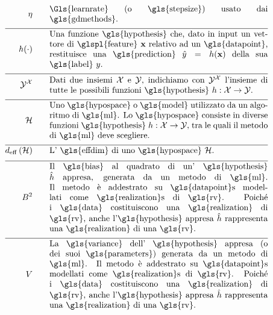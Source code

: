 \begin{align}
\lrate  \quad\quad & \parbox{.75\textwidth}{\Gls{learnrate} (o \gls{stepsize}) usato dai \gls{gdmethods}.}  \nonumber \\[2mm] \hline \nonumber\\[-5mm]
	\hypothesis(\cdot)  \quad\quad &\parbox{.75\textwidth}{Una funzione \gls{hypothesis} che, dato in input un vettore di \glspl{feature} $\featurevec$ relativo ad un \gls{datapoint}, restituisce una \gls{prediction} $\hat{\truelabel}=\hypothesis(\featurevec)$ della sua \gls{label} $\truelabel$.}  	 \nonumber \\[2mm] \hline \nonumber\\[-5mm]
	 \labelspace^{\featurespace} \quad\quad & \parbox{.75\textwidth}{Dati due insiemi $\featurespace$ e $\labelspace$, indichiamo con $ \labelspace^{\featurespace}$ l'insieme di tutte le possibili funzioni \gls{hypothesis} $\hypothesis: \featurespace \rightarrow \labelspace$.} 	 \nonumber \\[2mm] \hline \nonumber\\[-5mm]
	\hypospace  \quad\quad & \parbox{.75\textwidth}{Uno \gls{hypospace} o \gls{model} utilizzato da un algoritmo di \gls{ml}. 
		Lo \gls{hypospace} consiste in diverse funzioni \gls{hypothesis} $\hypothesis: \featurespace \rightarrow \labelspace$, tra le quali il metodo di \gls{ml} deve scegliere.}   \nonumber \\[2mm] \hline \nonumber\\[-5mm]
	\effdim{\hypospace}  \quad\quad & \parbox{.75\textwidth}{L' \gls{effdim} di uno \gls{hypospace} $\hypospace$.}   \nonumber \\[2mm] \hline \nonumber\\[-5mm]
	\biasterm^2 \quad\quad &\parbox{.75\textwidth}{
		Il \gls{bias} al quadrato di un' \gls{hypothesis} $\learnthypothesis$ 
		appresa, generata da un metodo di \gls{ml}. Il metodo è addestrato su \gls{datapoint}s 
		modellati come \gls{realization}s di \gls{rv}. Poiché i \gls{data} costituiscono una \gls{realization} 
		di \gls{rv}, anche l'\gls{hypothesis} appresa $\learnthypothesis$ rappresenta una \gls{realization} 
		di una \gls{rv}.} \nonumber  \nonumber \\[2mm] \hline \nonumber\\[-5mm]
	\varianceterm \quad\quad &\parbox{.75\textwidth}{La \gls{variance} dell' 
		\gls{hypothesis} appresa (o dei suoi \gls{parameters}) generata da un metodo di \gls{ml}. 
		Il metodo è addestrato su \gls{datapoint}s 
		modellati come \gls{realization}s di \gls{rv}. Poiché i \gls{data} costituiscono una \gls{realization} 
		di \gls{rv}, anche l'\gls{hypothesis} appresa $\learnthypothesis$ rappresenta una \gls{realization} 
		di una \gls{rv}.} \nonumber \nonumber %
\end{align}     

